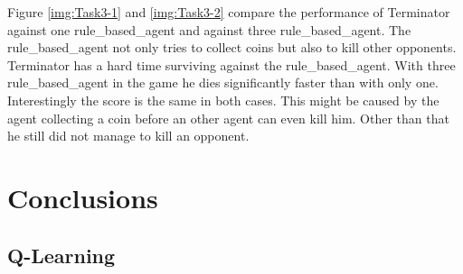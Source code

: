 \documentclass[
	letterpaper, %
	12pt, %
]{CSUniSchoolLabReport}
\begin{document}
Figure \ref{img:Task3-1} and \ref{img:Task3-2} compare the performance of Terminator against one rule\_based\_agent and against three rule\_based\_agent.
The rule\_based\_agent not only tries to collect coins but also to kill other opponents.
Terminator has a hard time surviving against the rule\_based\_agent.
With three rule\_based\_agent in the game he dies significantly faster than with only one.
Interestingly the score is the same in both cases.
This might be caused by the agent collecting a coin before an other agent can even kill him.
Other than that he still did not manage to kill an opponent.


\section{Conclusions}


\subsection*{Q-Learning}



\printbibliography %

\end{document}
